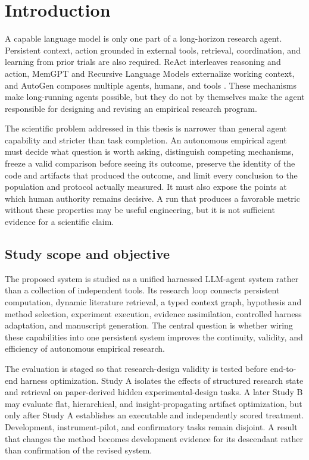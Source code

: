\documentclass[11pt,a4paper]{article}
\begin{document}
\section{Introduction}

A capable language model is only one part of a long-horizon research agent.
Persistent context, action grounded in external tools, retrieval, coordination,
and learning from prior trials are also required.  ReAct interleaves reasoning
and action, MemGPT and Recursive Language Models externalize working context, and
AutoGen composes multiple agents, humans, and tools \citep{react2023,memgpt2023,
rlm2025,autogen2023}.  These mechanisms make long-running agents possible, but
they do not by themselves make the agent responsible for designing and revising
an empirical research program.

The scientific problem addressed in this thesis is narrower than general agent
capability and stricter than task completion.  An autonomous empirical agent
must decide what question is worth asking, distinguish competing mechanisms,
freeze a valid comparison before seeing its outcome, preserve the identity of
the code and artifacts that produced the outcome, and limit every conclusion to
the population and protocol actually measured.  It must also expose the points
at which human authority remains decisive.  A run that produces a favorable metric
without these properties may be useful engineering, but it is not sufficient
evidence for a scientific claim.

\subsection{Study scope and objective}

The proposed system is studied as a unified harnessed LLM-agent system rather than a collection
of independent tools.  Its research loop connects persistent computation,
dynamic literature retrieval, a typed context graph, hypothesis and method
selection, experiment execution, evidence assimilation, controlled harness
adaptation, and manuscript generation.  The central question is whether wiring
these capabilities into one persistent system improves the continuity, validity,
and efficiency of autonomous empirical research.

The evaluation is staged so that research-design validity is tested before
end-to-end harness optimization.  Study A isolates the effects of structured
research state and retrieval on paper-derived hidden experimental-design tasks.
A later Study B may evaluate flat, hierarchical, and insight-propagating artifact
optimization, but only after Study A establishes an executable and independently
scored treatment.  Development, instrument-pilot, and confirmatory tasks remain
disjoint.  A result that changes the method becomes development evidence for its
descendant rather than confirmation of the revised system.
\end{document}
